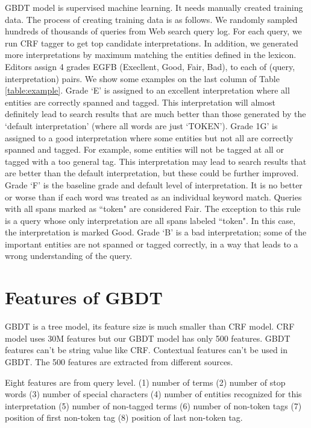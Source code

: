 \documentclass{acm_proc_article-sp}
\begin{document}
GBDT model is supervised machine learning. It needs manually created training data.
The process of creating training data is as follows. We randomly sampled hundreds of thousands of queries from Web search query log. For each query, we run CRF tagger to get top candidate interpretations. In addition, we generated more interpretations by maximum matching the entities defined in the lexicon. Editors assign 4 grades EGFB (Execllent, Good, Fair, Bad), to each of (query, interpretation) pairs. We show some examples on the last column of Table \ref{table:example}. 
Grade `E' is assigned to an excellent interpretation where all entities are correctly spanned and tagged. This interpretation will almost definitely lead to search results that are much better than those generated by the `default interpretation' (where all words are just `TOKEN').
Grade 1G' is assigned to a good interpretation where some entities but not all are correctly spanned and tagged. For example, some entities will not be tagged at all or tagged with a too general tag. This interpretation may lead to search results that are better than the default interpretation, but these could be further improved.
Grade `F' is the baseline grade and default level of interpretation. It is no better or worse than if each word was treated as an individual keyword match. Queries with all spans marked as ``token" are considered Fair. The exception to this rule is a query whose only interpretation are all spans labeled ``token". In this case, the interpretation is marked Good.
Grade `B' is a bad interpretation; some of the important entities are not spanned or tagged correctly, in a way that leads to a wrong understanding of the query.




\section{Features of GBDT}

GBDT is a tree model, its feature size is much smaller than CRF model. CRF model uses 30M features but our GBDT model has only 500 features. GBDT features can't be string value like CRF. Contextual features can't be used in GBDT. The 500 features are extracted from different sources. 

Eight features are from query level. (1) number of terms (2) number of stop words (3) number of special characters (4) number of entities recognized for this interpretation (5) number of non-tagged terms (6) number of non-token tags (7) position of first non-token tag (8) position of last non-token tag.
\end{document}

